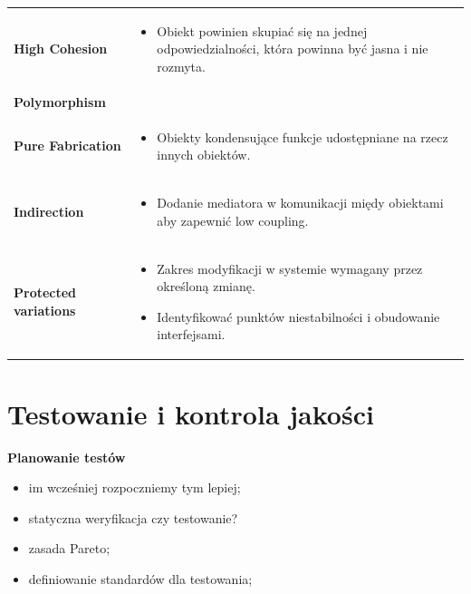 \documentclass[a4paper]{article}
\begin{document}
\begin{table}[H]
\begin{center}
\begin{tabular}{  p{3cm} p{12cm}  }
                \textbf{High Cohesion}
                &
                \begin{itemize}
                    \item Obiekt powinien skupiać się na jednej odpowiedzialności, która powinna być jasna i nie rozmyta.
                \end{itemize}
                \\

                \textbf{Polymorphism} & \\

                \textbf{Pure Fabrication}
                &
                \begin{itemize}
                    \item Obiekty kondensujące funkcje udostępniane na rzecz innych obiektów.
                \end{itemize}
                \\

                \textbf{Indirection}
                &
                \begin{itemize}
                    \item Dodanie mediatora w komunikacji międy obiektami aby zapewnić low coupling.
                \end{itemize}
                \\

                \textbf{Protected variations}
                &
                \begin{itemize}
                    \item Zakres modyfikacji w systemie
                    wymagany przez określoną zmianę.
                    \item Identyfikować punktów niestabilności i obudowanie interfejsami.
                \end{itemize}
            \end{tabular}
        \end{center}
    \end{table}


    \section{Testowanie i kontrola jakości}

    \textbf{Planowanie testów}
    \begin{itemize}
        \item im wcześniej rozpoczniemy tym lepiej;
        \item statyczna weryfikacja czy testowanie?
        \item zasada Pareto;
        \item definiowanie standardów dla testowania;
    \end{itemize}
\end{document}
